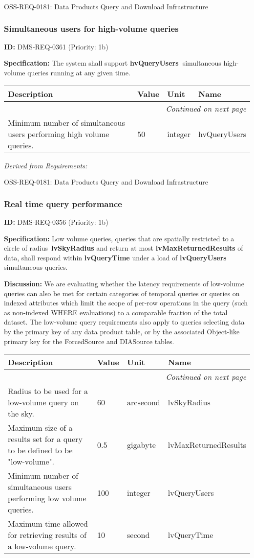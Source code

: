 \documentclass[SE,toc,lsstdraft]{lsstdoc}
\makeatletter
\newcommand{\paramname}[1]{\hspace{0pt}#1}
\newcommand{\unitname}[1]{\hspace{0pt}#1}
\newenvironment{parameters}[0]{%
\setlength\LTleft{0pt}
\setlength\LTright{\fill}
\begin{small}
\begin{longtable}[]{|p{0.49\textwidth}|l|p{0.6in}|p{1.70in}@{}|}

\hline \textbf{Description} & \textbf{Value} & \textbf{Unit} & \textbf{Name} \\ \hline
\endhead

\hline \multicolumn{4}{r}{\emph{Continued on next page}} \\
\endfoot

\hline\hline
\endlastfoot
}{%
\hline
\end{longtable}
\end{small}
}
\makeatother
\begin{document}
OSS-REQ-0181:
Data Products Query and Download Infrastructure \newline

\subsubsection{Simultaneous users for high-volume queries}

\label{DMS-REQ-0361}
\textbf{ID:} DMS-REQ-0361 (Priority: 1b)

\textbf{Specification:}
The system shall support \textbf{hvQueryUsers }simultaneous high-volume queries running at any given time.

\begin{parameters}
Minimum number of simultaneous users performing high volume queries.
&
50
&
\unitname{%
integer
}
&
\paramname{%
hvQueryUsers
} \\\hline
\end{parameters}

\emph{Derived from Requirements:}

OSS-REQ-0181:
Data Products Query and Download Infrastructure \newline

\subsubsection{Real time query performance}

\label{DMS-REQ-0356}
\textbf{ID:} DMS-REQ-0356 (Priority: 1b)

\textbf{Specification:}
Low volume queries, queries that are spatially restricted to a circle of radius \textbf{lvSkyRadius} and return at most \textbf{lvMaxReturnedResults} of data, shall respond within \textbf{lvQueryTime} under a load of \textbf{lvQueryUsers} simultaneous queries.

\textbf{Discussion:}
We are evaluating whether the latency requirements of low-volume queries can also be met for certain categories of temporal queries or queries on indexed attributes which limit the scope of per-row operations in the query (such as non-indexed WHERE evaluations) to a comparable fraction of the total dataset. The low-volume query requirements also apply to queries selecting data by the primary key of any data product table, or by the associated Object-like primary key for the ForcedSource and DIASource tables.

\begin{parameters}
Radius to be used for a low-volume query on the sky.
&
60
&
\unitname{%
arcsecond
}
&
\paramname{%
lvSkyRadius
} \\\hline
Maximum size of a results set for a query to be defined to be "low-volume".
&
0.5
&
\unitname{%
gigabyte
}
&
\paramname{%
lvMaxReturnedResults
} \\\hline
Minimum number of simultaneous users performing low volume queries.
&
100
&
\unitname{%
integer
}
&
\paramname{%
lvQueryUsers
} \\\hline
Maximum time allowed for retrieving results of a low-volume query.
&
10
&
\unitname{%
second
}
&
\paramname{%
lvQueryTime
} \\\hline
\end{parameters}
\end{document}
